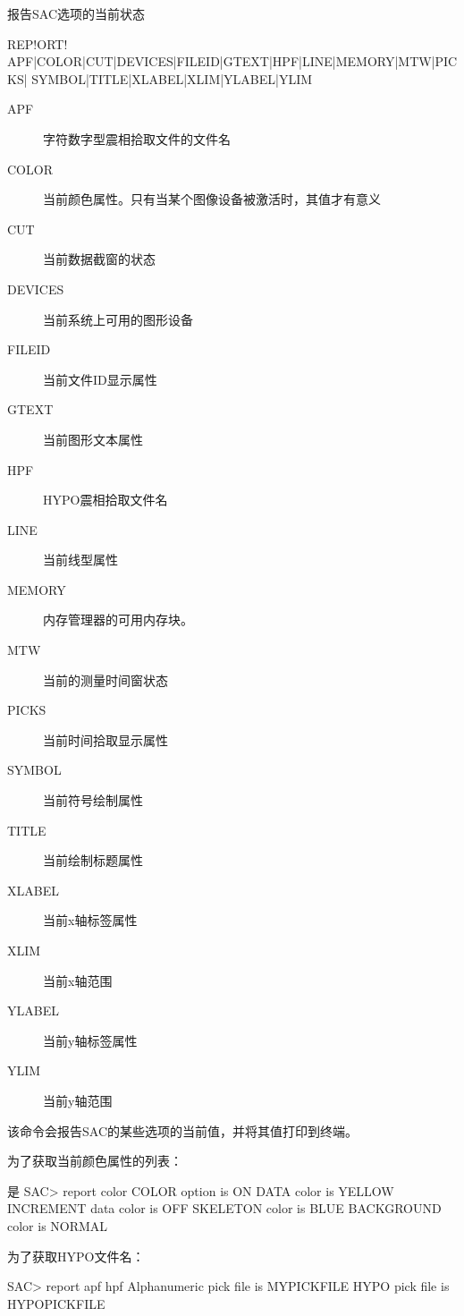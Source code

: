 \label{cmd:report}

报告SAC选项的当前状态

\begin{SACSTX}
REP!ORT! APF|COLOR|CUT|DEVICES|FILEID|GTEXT|HPF|LINE|MEMORY|MTW|PICKS|
    SYMBOL|TITLE|XLABEL|XLIM|YLABEL|YLIM  
\end{SACSTX}

\begin{description}
\item [APF] 字符数字型震相拾取文件的文件名
\item [COLOR] 当前颜色属性。只有当某个图像设备被激活时，其值才有意义
\item [CUT] 当前数据截窗的状态 
\item [DEVICES] 当前系统上可用的图形设备 
\item [FILEID] 当前文件ID显示属性 
\item [GTEXT] 当前图形文本属性 
\item [HPF] HYPO震相拾取文件名 
\item [LINE] 当前线型属性 
\item [MEMORY] 内存管理器的可用内存块。
\item [MTW] 当前的测量时间窗状态 
\item [PICKS] 当前时间拾取显示属性 
\item [SYMBOL] 当前符号绘制属性 
\item [TITLE] 当前绘制标题属性 
\item [XLABEL] 当前x轴标签属性 
\item [XLIM] 当前x轴范围 
\item [YLABEL] 当前y轴标签属性 
\item [YLIM] 当前y轴范围 
\end{description} 

该命令会报告SAC的某些选项的当前值，并将其值打印到终端。

为了获取当前颜色属性的列表：
\begin{SACCode}是
SAC> report color
 COLOR option is ON
 DATA color is YELLOW
 INCREMENT data color is OFF
 SKELETON color is BLUE
 BACKGROUND color is NORMAL
\end{SACCode}

为了获取HYPO文件名：
\begin{SACCode}
SAC> report apf hpf
 Alphanumeric pick file is MYPICKFILE
 HYPO pick file is HYPOPICKFILE
\end{SACCode}
